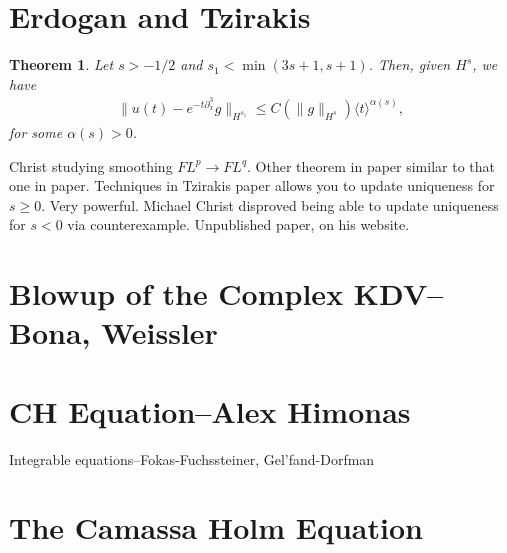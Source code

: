 \documentclass[12pt,reqno]{amsart}
\numberwithin{equation}{section}  %
\newcommand{\p}{\partial}
\newtheorem{theorem}{Theorem}[section]
\begin{document}
\section{Erdogan and Tzirakis}
\begin{theorem}
  Let $s > -1/2$ and $s_{1} < \min(3s+1, s+1)$. Then, given $H^{s}$, we
  have
  \begin{equation*}
    \begin{split}
      \| u(t) - e^{-t \p_{x}^{3}}g \|_{H^{s_{1}}} \le C (\| g
      \|_{H^{s}}) \langle t \rangle^{\alpha(s)},
    \end{split}
  \end{equation*}
  for some $\alpha(s) > 0$.
  \label{thm:main3}
\end{theorem}
Christ studying smoothing $FL^{p} \to FL^{q}$. Other theorem in paper
similar to that one in paper.
Techniques in Tzirakis paper allows you to update uniqueness for $s \ge 0$.
Very powerful.  Michael Christ disproved being able to update uniqueness
for $s < 0$ via counterexample. Unpublished paper, on his website.
\section{Blowup of the Complex KDV--Bona, Weissler} 
\label{sec:kdv-blowup}
\section{CH Equation--Alex Himonas} 
\label{sec:him}
Integrable equations--Fokas-Fuchssteiner, Gel'fand-Dorfman



\section{The Camassa Holm Equation}
\label{sec:ch}
\end{document}
